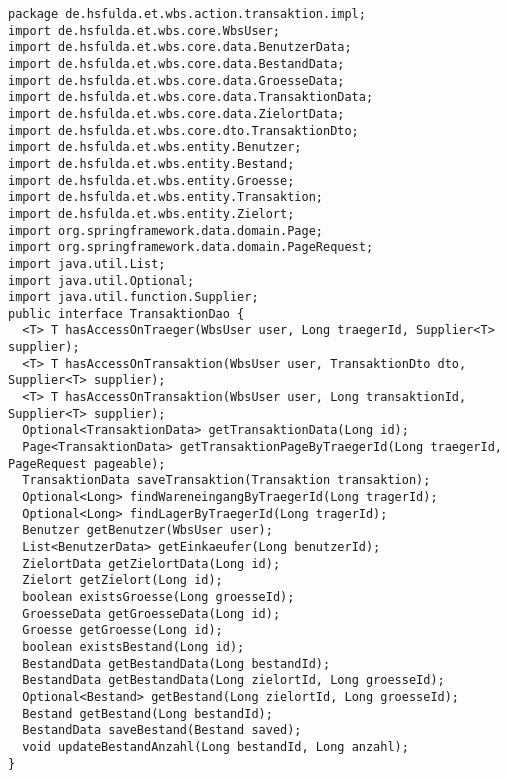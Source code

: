 \begin{lstlisting}[caption={Schnittstelle für die Abhängigkeitsumkehr zu \code{repository}.}, label={lst:n_TransaktionDao}]
package de.hsfulda.et.wbs.action.transaktion.impl;
import de.hsfulda.et.wbs.core.WbsUser;
import de.hsfulda.et.wbs.core.data.BenutzerData;
import de.hsfulda.et.wbs.core.data.BestandData;
import de.hsfulda.et.wbs.core.data.GroesseData;
import de.hsfulda.et.wbs.core.data.TransaktionData;
import de.hsfulda.et.wbs.core.data.ZielortData;
import de.hsfulda.et.wbs.core.dto.TransaktionDto;
import de.hsfulda.et.wbs.entity.Benutzer;
import de.hsfulda.et.wbs.entity.Bestand;
import de.hsfulda.et.wbs.entity.Groesse;
import de.hsfulda.et.wbs.entity.Transaktion;
import de.hsfulda.et.wbs.entity.Zielort;
import org.springframework.data.domain.Page;
import org.springframework.data.domain.PageRequest;
import java.util.List;
import java.util.Optional;
import java.util.function.Supplier;
public interface TransaktionDao {
  <T> T hasAccessOnTraeger(WbsUser user, Long traegerId, Supplier<T> supplier);
  <T> T hasAccessOnTransaktion(WbsUser user, TransaktionDto dto, Supplier<T> supplier);
  <T> T hasAccessOnTransaktion(WbsUser user, Long transaktionId, Supplier<T> supplier);
  Optional<TransaktionData> getTransaktionData(Long id);
  Page<TransaktionData> getTransaktionPageByTraegerId(Long traegerId, PageRequest pageable);
  TransaktionData saveTransaktion(Transaktion transaktion);
  Optional<Long> findWareneingangByTraegerId(Long tragerId);
  Optional<Long> findLagerByTraegerId(Long tragerId);
  Benutzer getBenutzer(WbsUser user);
  List<BenutzerData> getEinkaeufer(Long benutzerId);
  ZielortData getZielortData(Long id);
  Zielort getZielort(Long id);
  boolean existsGroesse(Long groesseId);
  GroesseData getGroesseData(Long id);
  Groesse getGroesse(Long id);
  boolean existsBestand(Long id);
  BestandData getBestandData(Long bestandId);
  BestandData getBestandData(Long zielortId, Long groesseId);
  Optional<Bestand> getBestand(Long zielortId, Long groesseId);
  Bestand getBestand(Long bestandId);
  BestandData saveBestand(Bestand saved);
  void updateBestandAnzahl(Long bestandId, Long anzahl);
}
\end{lstlisting}

